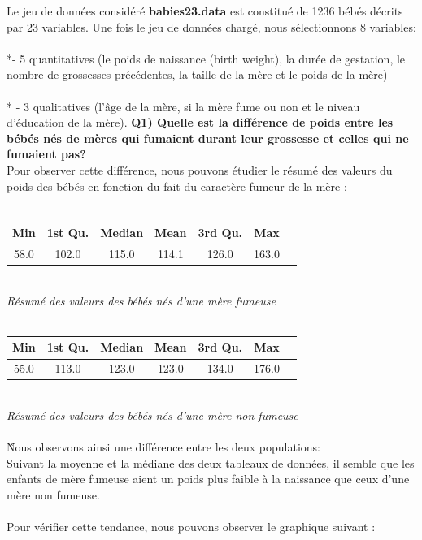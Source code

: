 ﻿\documentclass[a4paper, 9pt]{article}
\begin{document}
Le jeu de données considéré
\textbf{ babies23.data}
est constitué de 1236 bébés décrits par 23 variables. Une fois le jeu de données chargé, nous sélectionnons 8 variables:\\
\\*-  5 quantitatives (le poids de naissance (birth weight), la dur\'ee de gestation, le nombre de grossesses pr\'ec\'edentes,
la taille de la m\`ere et le poids de la m\`ere)\\
\\* - 3 qualitatives (l'\^age de la m\`ere,
si la m\`ere fume ou non et le niveau d'\'education de la m\`ere).
\newline
\newline\textbf{Q1) Quelle est la différence de poids entre les bébés nés de mères qui fumaient durant leur grossesse
et celles qui ne fumaient pas?}\\
Pour observer cette différence, nous pouvons étudier le résumé des valeurs du poids des b\'eb\'es en fonction du fait
du caractère fumeur de la mère :\\ \\
\begin{tabular}{|c|c|c|c|c|c|c|}
\hline
Min & 1st Qu. & Median & Mean & 3rd Qu. & Max \\
\hline
58.0 & 102.0 & 115.0 & 114.1 & 126.0 & 163.0 \\
\hline
\end{tabular}\\
\textit{R\'esum\'e des valeurs des b\'eb\'es n\'es d'une m\`ere fumeuse}\\ \\
\begin{tabular}{|c|c|c|c|c|c|c|}
\hline
Min & 1st Qu. & Median & Mean & 3rd Qu. & Max \\
\hline
55.0 & 113.0 & 123.0 & 123.0 & 134.0 & 176.0 \\
\hline
\end{tabular}\\
\textit{R\'esum\'e des valeurs des b\'eb\'es n\'es d'une m\`ere non fumeuse}\\ \\
\`Nous observons ainsi une diff\'erence entre les deux populations:\\
Suivant la moyenne et la m\'ediane des deux tableaux de donn\'ees, il semble que les enfants de mère fumeuse
aient un poids plus faible à la naissance que ceux d'une m\`ere non fumeuse.\\ \\
\newpage
Pour v\'erifier cette tendance, nous pouvons observer le graphique suivant :\\
\end{document}
